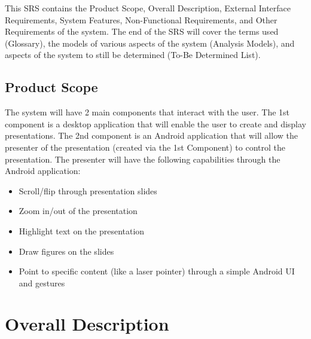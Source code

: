 \documentclass{article}
\begin{document}
This SRS contains the Product Scope, Overall Description, External Interface Requirements, System Features, Non-Functional Requirements, and Other Requirements of the system. 
The end of the SRS will cover the terms used (Glossary), the models of various aspects of the system (Analysis Models), and aspects of the system to still be determined (To-Be Determined List).

\subsection{Product Scope}
The system will have 2 main components that interact with the user. 
The 1st component is a desktop application that will enable the user to create and display presentations. 
The 2nd component is an Android application that will allow the presenter of the presentation (created via the 1st Component) to control the presentation. 
The presenter will have the following capabilities through the Android application:
\begin{itemize}
\item Scroll/flip through presentation slides
\item Zoom in/out of the presentation
\item Highlight text on the presentation
\item Draw figures on the slides
\item Point to specific content (like a laser pointer) through a simple Android UI and gestures
\end{itemize}




\newpage
\section{Overall Description}
\end{document}
